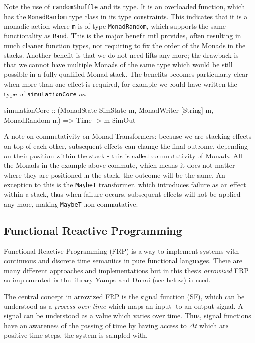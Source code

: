 Note the use of \texttt{randomShuffle} and its type. It is an overloaded function, which has the \texttt{MonadRandom} type class in its type constraints. This indicates that it is a monadic action where \texttt{m} is of type \texttt{MonadRandom}, which supports the same functionality as \texttt{Rand}. This is the major benefit mtl provides, often resulting in much cleaner function types, not requiring to fix the order of the Monads in the stacks. Another benefit is that we do not need lifts any more; the drawback is that we cannot have multiple Monads of the same type which would be still possible in a fully qualified Monad stack. The benefits becomes particularly clear when more than one effect is required, for example we could have written the type of \texttt{simulationCore} as:

\begin{HaskellCode}
simulationCore :: (MonadState SimState m, MonadWriter [String] m, MonadRandom m) 
               => Time -> m SimOut
\end{HaskellCode}

A note on commutativity on Monad Transformers: because we are stacking effects on top of each other, subsequent effects can change the final outcome, depending on their position within the stack - this is called commutativity of Monads. All the Monads in the example above commute, which means it does not matter where they are positioned in the stack, the outcome will be the same. An exception to this is the \texttt{MaybeT} transformer, which introduces failure as an effect within a stack, thus when failure occurs, subsequent effects will not be applied any more, making \texttt{MaybeT} non-commutative. 

\subsection{Functional Reactive Programming}
\label{sec:back_frp}
Functional Reactive Programming (FRP) is a way to implement systems with continuous and discrete time semantics in pure functional languages. There are many different approaches and implementations but in this thesis \textit{arrowized} FRP \cite{hughes_generalising_2000, hughes_programming_2005} as implemented in the library Yampa \cite{courtney_yampa_2003,hudak_arrows_2003,nilsson_functional_2002} and Dunai \cite{perez_functional_2016} (see below) is used.

The central concept in arrowized FRP is the signal function (SF), which can be understood as a \textit{process over time} which maps an input- to an output-signal. A signal can be understood as a value which varies over time. Thus, signal functions have an awareness of the passing of time by having access to $\Delta t$ which are positive time steps, the system is sampled with. 


